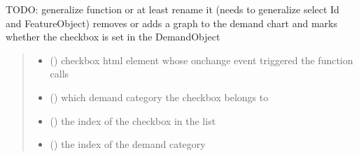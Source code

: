 \documentclass[letterpaper,10pt,english]{sphinxmanual}
\begin{document}
\begin{fulllineitems}
\label{\detokenize{docs_gui/js_api/urbs_editor/timevareff_editor:check_uncheck_timevareff}}
\pysigstartsignatures
{}
\pysigstopsignatures
\sphinxAtStartPar
TODO: generalize function or at least rename it (needs to generalize select Id and FeatureObject)
removes or adds a graph to the demand chart and marks whether the checkbox is set in the DemandObject
\begin{quote}\begin{description}
\begin{itemize}
\item {} 
\sphinxAtStartPar
{} () \textendash{} checkbox html element whose onchange event triggered the function calls

\item {} 
\sphinxAtStartPar
{} () \textendash{} which demand category the checkbox belongs to

\item {} 
\sphinxAtStartPar
{} () \textendash{} the index of the checkbox in the list

\item {} 
\sphinxAtStartPar
{} () \textendash{} the index of the demand category

\end{itemize}

\end{description}\end{quote}

\end{fulllineitems}

\end{document}
